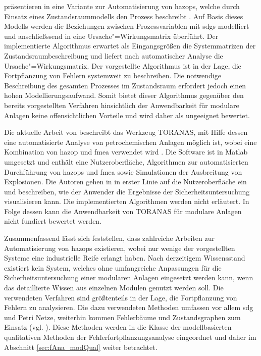 \citeauthor{Boonthum_2014} pr\"asentieren in  eine Variante zur Automatisierung von \acp{hazop}, welche durch Einsatz eines Zustandsraummodells den Prozess beschreibt \cite{Boonthum_2014}. Auf Basis dieses Modells werden die Beziehungen zwischen Prozessvariablen mit \acp{sdg} modelliert und anschlie\ss{}ssend in eine Ursache"=Wirkungsmatrix \"uberf\"uhrt. Der implementierte Algorithmus erwartet als Eingangsgr\"o\ss{}en die Systemmatrizen der Zustandsraumbeschreibung und liefert nach automatischer Analyse die Ursache"=Wirkungsmatrix. Der vorgestellte Algorithmus ist in der Lage, die Fortpflanzung von Fehlern systemweit zu beschreiben. Die notwendige Beschreibung des gesamten Prozesses im Zustandsraum erfordert jedoch einen hohen Modellierungsaufwand. Somit bietet dieser Algorithmus gegen\"uber den bereits vorgestellten Verfahren hinsichtlich der Anwendbarkeit f\"ur modulare Anlagen keine offensichtlichen Vorteile und wird daher als ungeeignet bewertet. 

Die aktuelle Arbeit von \citeauthor{Mechhoud_2016} beschreibt das Werkzeug TORANAS, mit Hilfe dessen eine automatisierte Analyse von petrochemischen Anlagen m\"oglich ist, wobei eine Kombination von \ac{hazop} und \ac{fmea} verwendet wird \cite{Mechhoud_2016}. Die Software ist in Matlab umgesetzt und enth\"alt eine Nutzeroberfl\"ache, Algorithmen zur automatisierten Durchf\"uhrung von \acp{hazop} und \ac{fmea} sowie Simulationen der Ausbreitung von Explosionen. Die Autoren gehen in  in erster Linie auf die Nutzeroberfl\"ache ein und beschreiben, wie der Anwender die Ergebnisse der Sicherheitsuntersuchung visualisieren kann. Die implementierten Algorithmen werden nicht erl\"autert. In Folge dessen kann die Anwendbarkeit von TORANAS f\"ur modulare Anlagen nicht fundiert bewertet werden.

Zusammenfassend l\"asst sich feststellen, dass zahlreiche Arbeiten zur Automatisierung von \acp{hazop} existieren, wobei nur wenige der vorgestellten Systeme eine industrielle Reife erlangt haben. Nach derzeitigem Wissensstand existiert kein System, welches ohne umfangreiche Anpassungen f\"ur die Sicherheitsuntersuchung einer modularen Anlagen eingesetzt werden kann, wenn das detaillierte Wissen aus einzelnen Modulen genutzt werden soll. \newline
Die verwendeten Verfahren sind gr\"o\ss{}tenteils in der Lage, die Fortpflanzung von Fehlern zu analysieren. Die dazu verwendeten Methoden umfassen vor allem \ac{sdg} und Petri Netze, weiterhin kommen Fehlerb\"aume und Zustandsgraphen zum Einsatz {(vgl. \cite[S. 3]{Palmer_2009} )}. Diese Methoden werden in die Klasse der modellbasierten qualitativen Methoden der Fehlerfortpflanzungsanalyse eingeordnet und daher im Abschnitt \ref{sec:fAna_modQual} weiter betrachtet. 


